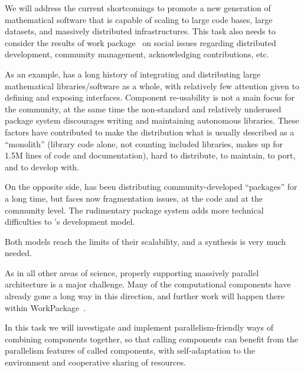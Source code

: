 \begin{workpackage}[id=component-architecture,wphases=3-24!.5,
  title=Component Architecture,lead=UV,
  PSRM=24,UVRM=1,SARM=1, USHRM=4]
\begin{tasklist}
\begin{task}[title=Modularization and packaging,id=mod-packaging]
    We will address the current shortcomings to promote a new
    generation of mathematical software that is capable of scaling to
    large code bases, large datasets, and massively distributed
    infrastructures. This task also needs to consider the results of
    work package~ on social issues regarding
    distributed development, community management, acknowledging
    contributions, etc.

    As an example, \Sage has a long history of integrating and
    distributing large mathematical libraries/software as a whole,
    with relatively few attention given to defining and exposing
    interfaces. Component re-usability is not a main focus for the
    \Sage community, at the same time the non-standard and relatively
    underused package system discourages writing and maintaining
    autonomous libraries. These factors have contributed to make the
    \Sage distribution what is usually described as a ``monolith''
    (\Sage library code alone, not counting included libraries, makes
    up for 1.5M lines of code and documentation), hard to distribute,
    to maintain, to port, and to develop with.

    On the opposite side, \GAP has been distributing
    community-developed ``\GAP packages'' for a long time, but faces
    now fragmentation issues, at the code and at the community
    level. The rudimentary package system adds more technical
    difficulties to \GAP's development model.

    Both models reach the limits of their scalability, and a synthesis
    is very much needed.
  \end{task}


  \begin{task}[title=Component architecture for High Performance Computing and Parallelism,id=component-for-HPC]
    As in all other areas of science, properly supporting massively
    parallel architecture is a major challenge. Many of the
    computational components have already gone a long way in this
    direction, and further work will happen there within
    WorkPackage~.

    In this task we will investigate and implement
    parallelism-friendly ways of combining components together, so
    that calling components can benefit from the parallelism features
    of called components, with self-adaptation to the environment and
    cooperative sharing of resources.
  \end{task}


\end{tasklist}
\end{workpackage}
